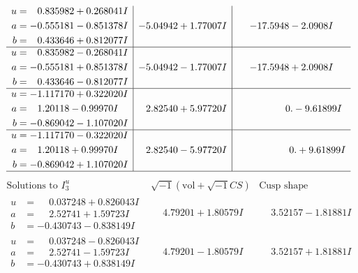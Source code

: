 \documentclass[1p]{elsarticle_modified}
\theoremstyle{definition}
\newcommand{\I}{\sqrt{-1}}
\begin{document}
$$\begin{array}{c|c|c}
\begin{aligned}
u &= \phantom{-}0.835982 + 0.268041 I \\
a &= -0.555181 - 0.851378 I \\
b &= \phantom{-}0.433646 + 0.812077 I\end{aligned}
 & -5.04942 + 1.77007 I & -17.5948 - 2.0908 I \\ \hline\begin{aligned}
u &= \phantom{-}0.835982 - 0.268041 I \\
a &= -0.555181 + 0.851378 I \\
b &= \phantom{-}0.433646 - 0.812077 I\end{aligned}
 & -5.04942 - 1.77007 I & -17.5948 + 2.0908 I \\ \hline\begin{aligned}
u &= -1.117170 + 0.322020 I \\
a &= \phantom{-}1.20118 - 0.99970 I \\
b &= -0.869042 - 1.107020 I\end{aligned}
 & \phantom{-}2.82540 + 5.97720 I & \phantom{-0.000000 } 0. - 9.61899 I \\ \hline\begin{aligned}
u &= -1.117170 - 0.322020 I \\
a &= \phantom{-}1.20118 + 0.99970 I \\
b &= -0.869042 + 1.107020 I\end{aligned}
 & \phantom{-}2.82540 - 5.97720 I & \phantom{-0.000000 -}0. + 9.61899 I\\
 \hline 
 \end{array}$$\newpage$$\begin{array}{c|c|c}  
\text{Solutions to }I^u_{3}& \I (\text{vol} + \sqrt{-1}CS) & \text{Cusp shape}\\
 \hline 
\begin{aligned}
u &= \phantom{-}0.037248 + 0.826043 I \\
a &= \phantom{-}2.52741 + 1.59723 I \\
b &= -0.430743 - 0.838149 I\end{aligned}
 & \phantom{-}4.79201 + 1.80579 I & \phantom{-}3.52157 - 1.81881 I \\ \hline\begin{aligned}
u &= \phantom{-}0.037248 - 0.826043 I \\
a &= \phantom{-}2.52741 - 1.59723 I \\
b &= -0.430743 + 0.838149 I\end{aligned}
 & \phantom{-}4.79201 - 1.80579 I & \phantom{-}3.52157 + 1.81881 I \\ \hline\begin{aligned}

\end{aligned}
\end{array}$$
\end{document}
